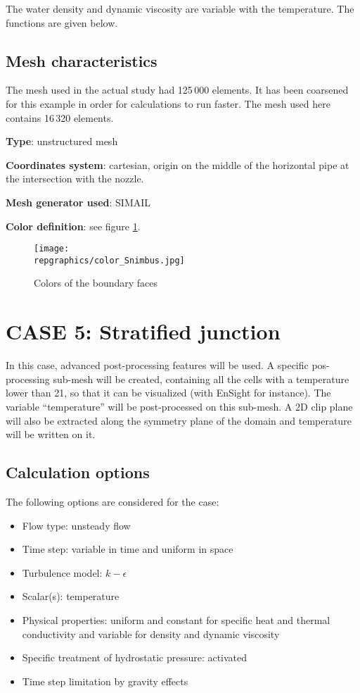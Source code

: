 The water density and dynamic viscosity are variable with the temperature. The
functions are given below.


	\subsection{Mesh characteristics}
The mesh used in the actual study had 125\,000 elements. It has been coarsened
for this example in order for calculations to run faster. The mesh used here
contains 16\,320 elements.

{\bfseries Type}: unstructured mesh

{\bfseries Coordinates system}: cartesian, origin on the middle of the horizontal pipe at the intersection with the nozzle.

{\bfseries Mesh generator used}: SIMAIL

{\bfseries Color definition}: see figure \ref{fige1_e5}.
   
\begin{figure}[h!]
\begin{center}
\texttt{[image: \\repgraphics/color\_Snimbus.jpg]} 
\caption{Colors of the boundary faces}
\label{fige1_e5}
\end{center}
\end{figure}


\section{CASE 5: Stratified junction}
In this case, advanced post-processing features will be used. A specific
pos-processing sub-mesh will be created, containing all the cells with a
temperature lower than 21\degresC, so that it can be visualized (with EnSight
for instance). The variable ``temperature'' will be post-processed on this
sub-mesh. A 2D clip plane will also be extracted along the symmetry plane of the
domain and temperature will be written on it.


	\subsection{Calculation options}

The following options are considered for the case: 
\begin{itemize}
\renewcommand{\labelitemi}{$\rightarrow$}
	\item Flow type: unsteady flow
	\item Time step: variable in time and uniform in space
	\item Turbulence model: $k-\epsilon$
	\item Scalar(s): temperature
	\item Physical properties: uniform and constant for specific heat and
thermal conductivity and variable for density and dynamic viscosity
	\item Specific treatment of hydrostatic pressure: activated
	\item Time step limitation by gravity effects
\end{itemize}


